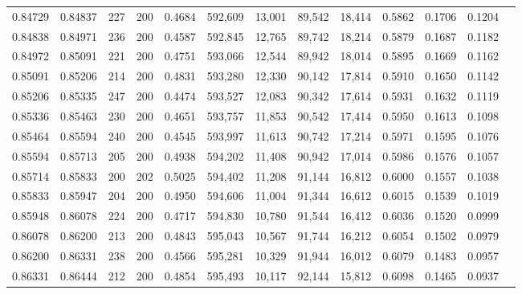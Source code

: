 \begin{tabular}{rrrrrrrrrrrrr}
0.84729 & 0.84837 &    227 & 200 &                                     0.4684 & 592,609 &  13,001 &  89,542 &  18,414 & 0.5862 & 0.1706 & 0.1204 \\
0.84838 & 0.84971 &    236 & 200 &                                     0.4587 & 592,845 &  12,765 &  89,742 &  18,214 & 0.5879 & 0.1687 & 0.1182 \\
0.84972 & 0.85091 &    221 & 200 &                                     0.4751 & 593,066 &  12,544 &  89,942 &  18,014 & 0.5895 & 0.1669 & 0.1162 \\
0.85091 & 0.85206 &    214 & 200 &                                     0.4831 & 593,280 &  12,330 &  90,142 &  17,814 & 0.5910 & 0.1650 & 0.1142 \\
0.85206 & 0.85335 &    247 & 200 &                                     0.4474 & 593,527 &  12,083 &  90,342 &  17,614 & 0.5931 & 0.1632 & 0.1119 \\
0.85336 & 0.85463 &    230 & 200 &                                     0.4651 & 593,757 &  11,853 &  90,542 &  17,414 & 0.5950 & 0.1613 & 0.1098 \\
0.85464 & 0.85594 &    240 & 200 &                                     0.4545 & 593,997 &  11,613 &  90,742 &  17,214 & 0.5971 & 0.1595 & 0.1076 \\
0.85594 & 0.85713 &    205 & 200 &                                     0.4938 & 594,202 &  11,408 &  90,942 &  17,014 & 0.5986 & 0.1576 & 0.1057 \\
0.85714 & 0.85833 &    200 & 202 &                                     0.5025 & 594,402 &  11,208 &  91,144 &  16,812 & 0.6000 & 0.1557 & 0.1038 \\
0.85833 & 0.85947 &    204 & 200 &                                     0.4950 & 594,606 &  11,004 &  91,344 &  16,612 & 0.6015 & 0.1539 & 0.1019 \\
0.85948 & 0.86078 &    224 & 200 &                                     0.4717 & 594,830 &  10,780 &  91,544 &  16,412 & 0.6036 & 0.1520 & 0.0999 \\
0.86078 & 0.86200 &    213 & 200 &                                     0.4843 & 595,043 &  10,567 &  91,744 &  16,212 & 0.6054 & 0.1502 & 0.0979 \\
0.86200 & 0.86331 &    238 & 200 &                                     0.4566 & 595,281 &  10,329 &  91,944 &  16,012 & 0.6079 & 0.1483 & 0.0957 \\
0.86331 & 0.86444 &    212 & 200 &                                     0.4854 & 595,493 &  10,117 &  92,144 &  15,812 & 0.6098 & 0.1465 & 0.0937 \\

\end{tabular}
